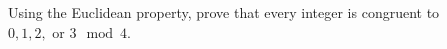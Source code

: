   Using the Euclidean property, prove that
  every integer is congruent to $0, 1, 2, \text{ or } 3 \mod{4}$.
